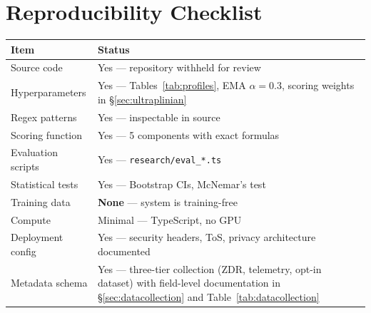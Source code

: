 \documentclass[11pt]{article}
\begin{document}



\newpage
\appendix
\section{Reproducibility Checklist}

\begin{table}[h]
\centering
\small
\begin{tabular}{@{}lp{8cm}@{}}
\toprule
Item & Status \\
\midrule
Source code & Yes --- repository withheld for review \\
Hyperparameters & Yes --- Tables~\ref{tab:profiles}, EMA $\alpha=0.3$, scoring weights in \S\ref{sec:ultraplinian} \\
Regex patterns & Yes --- inspectable in source \\
Scoring function & Yes --- 5 components with exact formulas \\
Evaluation scripts & Yes --- \texttt{research/eval\_*.ts} \\
Statistical tests & Yes --- Bootstrap CIs, McNemar's test \\
Training data & \textbf{None} --- system is training-free \\
Compute & Minimal --- TypeScript, no GPU \\
Deployment config & Yes --- security headers, ToS, privacy architecture documented \\
Metadata schema & Yes --- three-tier collection (ZDR, telemetry, opt-in dataset) with field-level documentation in \S\ref{sec:datacollection} and Table~\ref{tab:datacollection} \\
\bottomrule
\end{tabular}
\end{table}
\end{document}
